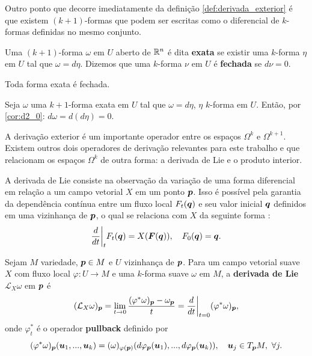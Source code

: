 Outro ponto que decorre imediatamente da definição \ref{def:derivada_exterior} é que existem $(k+1)$-formas que podem ser escritas como o diferencial de $k$-formas definidas no mesmo conjunto.

\begin{definition}
    Uma $(k+1)$-forma $\omega$ em $U$ aberto de $\mathbb{R}^n$ é dita \textbf{exata} se existir uma $k$-forma $\eta$ em $U$ tal que $\omega = d\eta$. Dizemos que uma $k$-forma $\nu$ em $U$ é \textbf{fechada} se $d \nu = 0$.
\end{definition}

\begin{corollary}
    Toda forma exata é fechada.
\end{corollary}
\begin{Proof}
    Seja $\omega$ uma $k+1$-forma exata em $U$ tal que $\omega = d\eta$, $\eta$ $k$-forma em $U$. Então, por \ref{cor:d2_0}: $d\omega = d(d \eta) = 0$.
\end{Proof}

A derivação exterior é um importante operador entre os espaços $\Omega^k$ e $\Omega^{k+1}$. Existem outros dois operadores de derivação relevantes para este trabalho e que relacionam os espaços $\Omega^k$ de outra forma: a derivada de Lie e o produto interior.

A derivada de Lie consiste na observação da variação de uma forma diferencial em relação a um campo vetorial $X$ em um ponto $\bm p$. Isso é possível pela garantia da dependência contínua entre um fluxo local $F_t (\bm q)$ e seu valor inicial $\bm q$ definidos em uma vizinhança de $\bm p$, o qual se relaciona com $X$ da seguinte forma \citep[155]{Tu2010-sb}:
\begin{equation*}
    \dfrac{d }{d t} \bigg \rvert_{t} F_t (\bm q) = X(\bm F(\bm q)),
    \quad
    F_0(\bm q) = \bm q.
\end{equation*}

\begin{definition}
    Sejam $M$ variedade, $\bm p \in M$ e $U$ vizinhança de $\bm p$.
    Para um campo vetorial suave $X$ com fluxo local $\varphi: U \to M$ e uma $k$-forma suave $\omega$ em $M$, a \textbf{derivada de Lie} $\mathcal L_X \omega$ em $\bm p$ é
    \begin{equation*}
        (\mathcal L_X \omega)_{\bm p} =
        \lim_{t \to 0} \dfrac{(\varphi^* \omega)_{\bm p} - \omega_{\bm p}}{t} =
        \dfrac{d }{d t}\bigg\rvert_{t=0} (\varphi^* \omega)_{\bm p},
    \end{equation*}
    onde $\varphi_t^*$ é o operador \textbf{pullback} definido por
    \begin{equation*}
        (\varphi^* \omega)_{\bm p} (\bm u_1, ..., \bm u_k) = (\omega)_{\varphi(\bm p)}(d\varphi_{\bm p} (\bm u_1), ..., d \varphi_{\bm p} (\bm u_k)),
        \quad
        \bm u_j \in T_{\bm p} M, \ \forall j.
    \end{equation*}
\end{definition}

